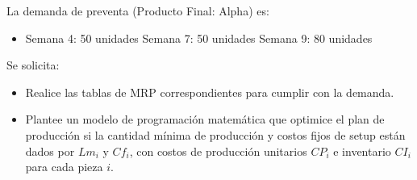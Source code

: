 \documentclass[11pt, a4paper]{article}
\begin{document}
  \begin{center}
  \end{center}

  La demanda de preventa (Producto Final: Alpha) es:
  \begin{itemize}
    \item Semana 4: 50 unidades \quad Semana 7: 50 unidades \quad Semana 9: 80 unidades
  \end{itemize}

  Se solicita:
  \begin{itemize}
    \item[\textbf{i.}] Realice las tablas de MRP correspondientes para cumplir con la demanda.
    \item[\textbf{ii.}] Plantee un modelo de programación matemática que optimice el plan de producción si la cantidad mínima de producción y costos fijos de setup están dados por $Lm_i$ y $Cf_i$, con costos de producción unitarios $CP_i$ e inventario $CI_i$ para cada pieza $i$.
  \end{itemize}
\end{document}
